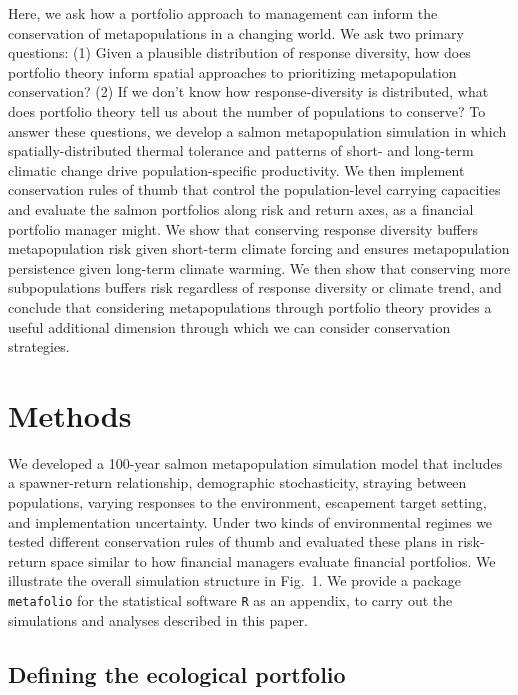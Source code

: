 Here, we ask how a portfolio approach to management can inform the conservation of metapopulations in a changing world. We ask two primary questions: (1) Given a plausible distribution of response diversity, how does portfolio theory inform spatial approaches to prioritizing metapopulation conservation? (2) If we don't know how response-diversity is distributed, what does portfolio theory tell us about the number of populations to conserve? To answer these questions, we develop a salmon metapopulation simulation in which spatially-distributed thermal tolerance and patterns of short- and long-term climatic change drive population-specific productivity. We then implement conservation rules of thumb that control the population-level carrying capacities and evaluate the salmon portfolios along risk and return axes, as a financial portfolio manager might. We show that conserving response diversity buffers metapopulation risk given short-term climate forcing and ensures metapopulation persistence given long-term climate warming. We then show that conserving more subpopulations buffers risk regardless of response diversity or climate trend, and conclude that considering metapopulations through portfolio theory provides a useful additional dimension through which we can consider conservation strategies.

\section{Methods}

We developed a 100-year salmon metapopulation simulation model that includes a spawner-return relationship, demographic stochasticity, straying between populations, varying responses to the environment, escapement target setting, and implementation uncertainty. Under two kinds of environmental regimes we tested different conservation rules of thumb and evaluated these plans in risk-return space similar to how financial managers evaluate financial portfolios. We illustrate the overall simulation structure in Fig.~1. We provide a package \texttt{metafolio} for the statistical software \texttt{R} \citep{r2013} as an appendix, to carry out the simulations and analyses described in this paper.

\subsection{Defining the ecological portfolio}

